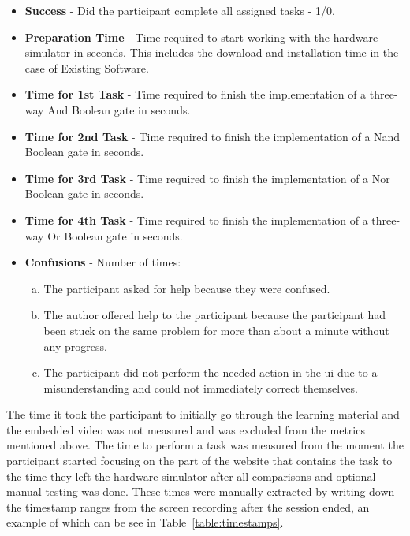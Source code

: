 \begin{itemize}
    \item \textbf{Success} - Did the participant complete all assigned tasks - 1/0.
    \item \textbf{Preparation Time} - Time required to start working with the hardware simulator in seconds. This includes the download and installation time in the case of Existing Software.
    \item \textbf{Time for 1st Task} - Time required to finish the implementation of a three-way And Boolean gate in seconds.
    \item \textbf{Time for 2nd Task} - Time required to finish the implementation of a Nand Boolean gate in seconds.
    \item \textbf{Time for 3rd Task} - Time required to finish the implementation of a Nor Boolean gate in seconds.
    \item \textbf{Time for 4th Task} - Time required to finish the implementation of a three-way Or Boolean gate in seconds.
    \item \textbf{Confusions} - Number of times:
    \begin{enumerate}[(a)]
        \item The participant asked for help because they were confused.
        \item The author offered help to the participant because the participant had been stuck on the same problem for more than about a minute without any progress.
        \item The participant did not perform the needed action in the \gls{ui} due to a misunderstanding and could not immediately correct themselves.
    \end{enumerate}
\end{itemize}

The time it took the participant to initially go through the learning material and the embedded video was not measured and was excluded from the metrics mentioned above.
The time to perform a task was measured from the moment the participant started focusing on the part of the website that contains the task to the time they left the hardware simulator after all comparisons and optional manual testing was done.
These times were manually extracted by writing down the timestamp ranges from the screen recording after the session ended, an example of which can be see in Table~\ref{table:timestamps}.

